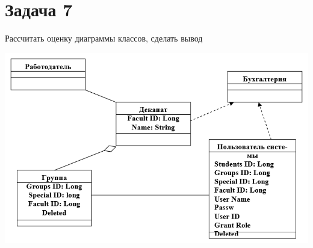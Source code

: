 \documentclass{article}
\begin{document}
\section{Задача 7}
Рассчитать оценку диаграммы классов, сделать вывод

\includegraphics[width=\textwidth]{task7.png}
\end{document}
